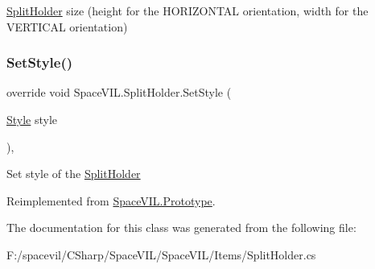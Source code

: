 \mbox{\hyperlink{class_space_v_i_l_1_1_split_holder}{Split\+Holder}} size (height for the H\+O\+R\+I\+Z\+O\+N\+T\+AL orientation, width for the V\+E\+R\+T\+I\+C\+AL orientation) 

\mbox{\label{class_space_v_i_l_1_1_split_holder_a0489f7db33f2310761600b11ea308c40}} 
\subsubsection{\texorpdfstring{Set\+Style()}{SetStyle()}}
{\footnotesize\ttfamily override void Space\+V\+I\+L.\+Split\+Holder.\+Set\+Style (\begin{DoxyParamCaption}\item[{\mbox{\hyperlink{class_space_v_i_l_1_1_decorations_1_1_style}{Style}}}]{style }\end{DoxyParamCaption})\hspace{0.3cm}{\ttfamily [inline]}, {\ttfamily [virtual]}}



Set style of the \mbox{\hyperlink{class_space_v_i_l_1_1_split_holder}{Split\+Holder}} 



Reimplemented from \mbox{\hyperlink{class_space_v_i_l_1_1_prototype_ae96644a6ace490afb376fb542161e541}{Space\+V\+I\+L.\+Prototype}}.



The documentation for this class was generated from the following file\+:\begin{DoxyCompactItemize}
\item 
F\+:/spacevil/\+C\+Sharp/\+Space\+V\+I\+L/\+Space\+V\+I\+L/\+Items/Split\+Holder.\+cs\end{DoxyCompactItemize}
